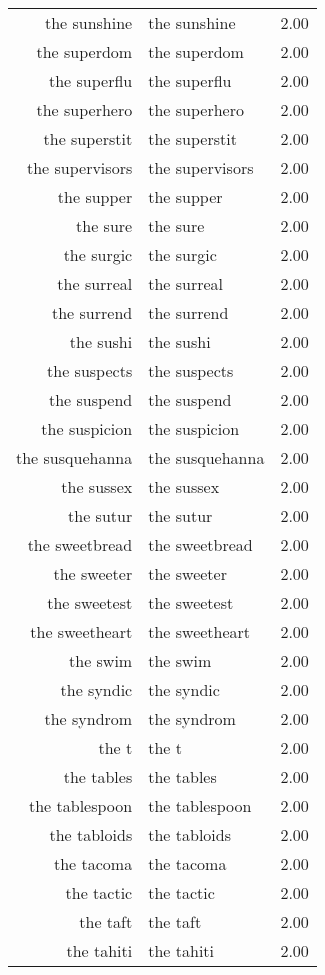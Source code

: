 \begin{table}[ht]
\begin{tabular}{rlr}
  the sunshine & the sunshine & 2.00 \\ 
  the superdom & the superdom & 2.00 \\ 
  the superflu & the superflu & 2.00 \\ 
  the superhero & the superhero & 2.00 \\ 
  the superstit & the superstit & 2.00 \\ 
  the supervisors & the supervisors & 2.00 \\ 
  the supper & the supper & 2.00 \\ 
  the sure & the sure & 2.00 \\ 
  the surgic & the surgic & 2.00 \\ 
  the surreal & the surreal & 2.00 \\ 
  the surrend & the surrend & 2.00 \\ 
  the sushi & the sushi & 2.00 \\ 
  the suspects & the suspects & 2.00 \\ 
  the suspend & the suspend & 2.00 \\ 
  the suspicion & the suspicion & 2.00 \\ 
  the susquehanna & the susquehanna & 2.00 \\ 
  the sussex & the sussex & 2.00 \\ 
  the sutur & the sutur & 2.00 \\ 
  the sweetbread & the sweetbread & 2.00 \\ 
  the sweeter & the sweeter & 2.00 \\ 
  the sweetest & the sweetest & 2.00 \\ 
  the sweetheart & the sweetheart & 2.00 \\ 
  the swim & the swim & 2.00 \\ 
  the syndic & the syndic & 2.00 \\ 
  the syndrom & the syndrom & 2.00 \\ 
  the t & the t & 2.00 \\ 
  the tables & the tables & 2.00 \\ 
  the tablespoon & the tablespoon & 2.00 \\ 
  the tabloids & the tabloids & 2.00 \\ 
  the tacoma & the tacoma & 2.00 \\ 
  the tactic & the tactic & 2.00 \\ 
  the taft & the taft & 2.00 \\ 
  the tahiti & the tahiti & 2.00 \\ 

\end{tabular}
\end{table}
